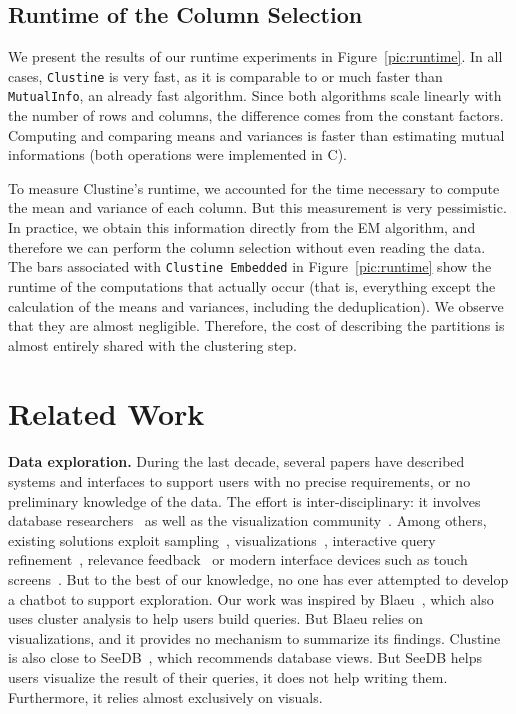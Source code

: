 \subsection{Runtime of the Column Selection}
\label{sec:speed}

We present the results of our runtime experiments in Figure~\ref{pic:runtime}.
In all cases, \texttt{Clustine} is very fast, as it is comparable to or much
faster than \texttt{MutualInfo}, an already fast algorithm. Since both
algorithms scale linearly with the number of rows and columns, the difference
comes from the constant factors. Computing and comparing means and variances
is faster than estimating mutual informations (both operations were
implemented in C).


To measure Clustine's runtime, we accounted for the time necessary to compute
the mean and variance of each column. But this measurement is very pessimistic.
In practice, we obtain this information directly from the EM algorithm, and
therefore we can perform the column selection without even reading the data.
The bars associated with \texttt{Clustine Embedded} in Figure~\ref{pic:runtime}
show the runtime of the computations that actually occur (that is, everything
except the calculation of the means and variances, including the
deduplication). We observe that they are almost negligible. Therefore, the cost
of describing the partitions is almost entirely shared with the clustering
step.

\section{Related Work}
\label{sec:related}

\textbf{Data exploration.} During the last decade, several papers have
described systems and interfaces to support users with no precise requirements,
or no preliminary knowledge of the data. The effort is inter-disciplinary: it
involves database researchers~\cite{idreos2015overview} as well as the
visualization community~\cite{StolteTangHanrahan2002}. Among others, existing
solutions exploit sampling~\cite{agarwal2012blink},
visualizations~\cite{StolteTangHanrahan2002}, interactive query
refinement~\cite{dimitriadou2014explore}, relevance
feedback~\cite{akbarnejad2010sql} or modern interface devices such as touch
screens~\cite{jiang2015snaptoquery}. But to the best of our knowledge, no one
has ever attempted to develop a chatbot to support exploration. Our work was
inspired by Blaeu~\cite{sellamTKDE}, which also uses cluster analysis to help
users build queries. But Blaeu relies on visualizations, and it provides no
mechanism to summarize its findings. Clustine is also close to
SeeDB~\cite{vartak2015see}, which recommends database views. But SeeDB helps
users visualize the result of their queries, it does not help writing them.
Furthermore, it relies almost exclusively on visuals.

